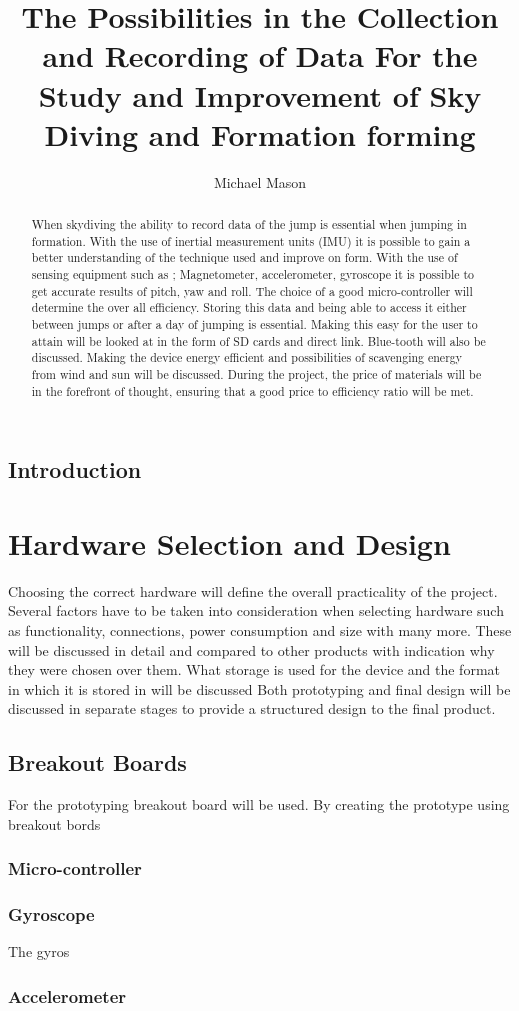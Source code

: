 \documentclass{report}
\begin{document}
\title{The Possibilities in the Collection and Recording of Data For the Study and Improvement of Sky Diving and Formation forming}
\author{Michael Mason}

\maketitle

\begin{abstract}
When skydiving the ability to record data of the jump is essential when jumping in formation. With the use of inertial measurement units (IMU) it is possible to gain a better understanding of the technique used and improve on form. With the use of sensing equipment such as ; Magnetometer, accelerometer, gyroscope it is possible to get accurate results of pitch, yaw and roll. The choice of a good micro-controller will determine the over all efficiency.
Storing this data and being able to access it either between jumps or after a day of jumping is essential. Making this easy for the user to attain will be looked at in the form of SD cards and direct link. Blue-tooth will also be discussed.
Making the device energy efficient and possibilities of scavenging energy from wind and sun will be discussed. During the project, the price of materials will be in the forefront of thought, ensuring that a good price to efficiency ratio will be met.

\end{abstract}

\tableofcontents

\newpage

\section{Introduction}


\chapter{Hardware Selection and Design}
Choosing the correct hardware will define the overall practicality of the project. Several factors have to be taken into consideration when selecting hardware such as functionality, connections, power consumption and size with many more. These will be discussed in detail and compared to other products with indication why they were chosen over them. What storage is used for the device and the format in which it is stored in will be discussed
Both prototyping and final design will be discussed in separate stages to provide a structured design to the final product.

\section{Breakout Boards}
For the prototyping breakout board will be used. By creating the prototype using breakout bords
 
\subsection{Micro-controller}

\subsection{Gyroscope}
The gyros
\subsection{Accelerometer}
\end{document}
